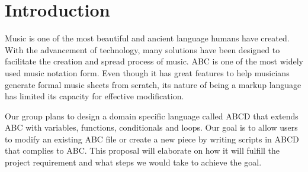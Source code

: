 \section{Introduction}

Music is one of the most beautiful and ancient language humans have created. With the advancement of technology, many solutions have been designed to facilitate the creation and spread process of music. ABC is one of the most widely used music notation form. Even though it has great features to help musicians generate formal music sheets from scratch, its nature of being a markup language has limited its capacity for effective modification.

Our group plans to design a domain specific language called ABCD that extends ABC with variables, functions, conditionals and loops. Our goal is to allow users to modify an existing ABC file or create a new piece by writing scripts in ABCD that complies to ABC. This proposal will elaborate on how it will fulfill the project requirement and what steps we would take to achieve the goal.
